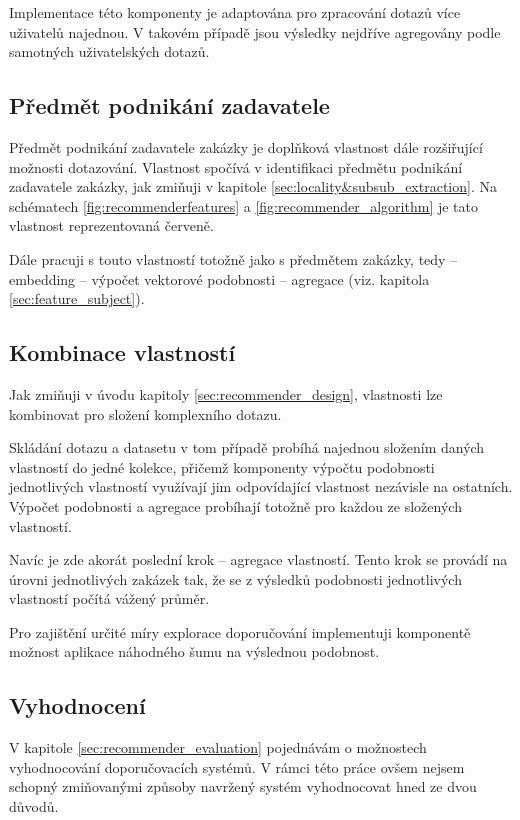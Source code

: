 \documentclass[thesis=M,czech]{FITthesis}[2019/12/23]
\begin{document}
Implementace této komponenty je adaptována pro zpracování dotazů více uživatelů najednou. V takovém případě jsou výsledky nejdříve agregovány podle samotných uživatelských dotazů.


\subsection{Předmět podnikání zadavatele}
\label{sec:feature_entity_subject}

Předmět podnikání zadavatele zakázky je doplňková vlastnost dále rozšiřující možnosti dotazování. Vlastnost spočívá v identifikaci předmětu podnikání zadavatele zakázky, jak zmiňuji v kapitole \ref{sec:locality&subsub_extraction}. Na schématech \ref{fig:recommenderfeatures} a \ref{fig:recommender_algorithm} je tato vlastnost reprezentovaná červeně.

Dále pracuji s touto vlastností totožně jako s předmětem zakázky, tedy -- embedding -- výpočet vektorové podobnosti -- agregace (viz. kapitola \ref{sec:feature_subject}).


\subsection{Kombinace vlastností}

Jak zmiňuji v úvodu kapitoly \ref{sec:recommender_design}, vlastnosti lze kombinovat pro složení komplexního dotazu.

Skládání dotazu a datasetu v tom případě probíhá najednou složením daných vlastností do jedné kolekce, přičemž komponenty výpočtu podobnosti jednotlivých vlastností využívají jim odpovídající vlastnost nezávisle na ostatních. Výpočet podobnosti a agregace probíhají totožně pro každou ze složených vlastností.

Navíc je zde akorát poslední krok -- agregace vlastností. Tento krok se provádí na úrovni jednotlivých zakázek tak, že se z výsledků podobnosti jednotlivých vlastností počítá vážený průměr.

Pro zajištění určité míry explorace doporučování implementuji komponentě možnost aplikace náhodného šumu na výslednou podobnost.

\subsection{Vyhodnocení}

V kapitole \ref{sec:recommender_evaluation} pojednávám o možnostech vyhodnocování doporučovacích systémů. V rámci této práce ovšem nejsem schopný zmiňovanými způsoby navržený systém vyhodnocovat hned ze dvou důvodů.
\end{document}
